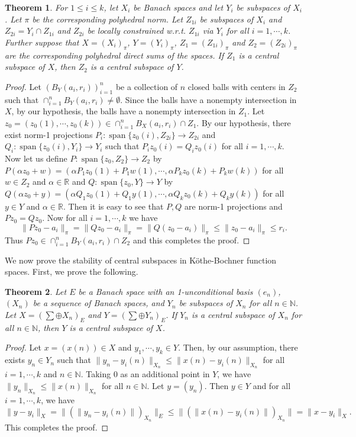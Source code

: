 \documentclass[11pt]{amsart}
\newtheorem{thm}{Theorem}[section]
\newcommand{\ra}{\rightarrow}
\newcommand{\es}{\emptyset}
\newcommand{\al}{\alpha}
\newcommand{\mb}{\mathbb}
\DeclareMathOperator{\spn}{span}
\begin{document}
\begin{thm}
For $1\leq i\leq k$, let $X_i$ be Banach spaces and let $Y_i$ be subspaces of $X_i$. Let $\pi$ be the corresponding polyhedral norm. Let $Z_{1i}$ be subspaces of $X_i$ and  $Z_{2i}=Y_i\cap Z_{1i}$ and $Z_{2i}$ be locally constrained w.r.t. $Z_{1i}$ via $Y_i$ for all $i=1,\cdots,k$. Further suppose that $X=(X_i)_{\pi}$, $Y=(Y_i)_\pi$, $Z_1=(Z_{1i})_\pi$ and $Z_2=(Z_{2i})_\pi$ are the corresponding polyhedral direct sums of the spaces. If $Z_1$ is a central subspace of $X$, then $Z_2$ is a central subspace of $Y$.
\end{thm}
\begin{proof}
Let $(B_Y(a_i,r_i))_{i=1}^n$ be a collection of $n$ closed balls  with centers in $Z_2$ such that $\cap_{i=1}^nB_Y(a_i,r_i)\neq\es$. Since the balls have a nonempty intersection in $X$, by our hypothesis, the balls have a nonempty intersection in $Z_1$. Let $z_0=(z_0(1),\cdots,z_0(k))\in\cap_{i=1}^nB_X(a_i,r_i)\cap Z_1$. By our hypothesis, there exist norm-1 projections $P_i:\spn\{z_0(i),Z_{2i}\}\ra Z_{2i}$ and $Q_i:\spn\{z_0(i),Y_i\}\ra Y_i$ such that $P_iz_0(i)=Q_iz_0(i)$ for all $i=1,\cdots,k$. Now let us define  $P:\spn\{z_0,Z_2\}\ra Z_2$ by $P(\al z_0+w)=(\al P_1z_0(1)+P_1w(1),\cdots,\al P_kz_0(k)+P_kw(k))$ for all $w\in Z_2$ and $\al\in\mb{R}$ and $Q:\spn\{z_0,Y\}\ra Y$ by $Q(\al z_0+y)=(\al Q_1z_0(1)+Q_1y(1),\cdots,\al Q_kz_0(k)+Q_ky(k))$ for all $y\in Y$ and $\al\in\mb{R}$. Then it is easy to see that $P,Q$ are norm-1 projections and $Pz_0=Qz_0$. Now for all $i=1,\cdots,k$ we have 
\[
\|Pz_0-a_i\|_\pi=\|Qz_0-a_i\|_\pi=\|Q(z_0-a_i)\|_\pi\leq\|z_0-a_i\|_\pi\leq r_i.
\]
Thus $Pz_0\in\cap_{i=1}^nB_Y(a_i,r_i)\cap Z_2$ and this completes the proof.
\end{proof}
We now prove the stability of central subspaces in K\"othe-Bochner function spaces. First, we prove the following.
\begin{thm}
Let $E$ be a Banach space with an 1-unconditional basis $(e_n)$, $(X_n)$ be a sequence of Banach spaces,  and $Y_n$ be subspaces of $X_n$ for all $n\in\mb{N}$. Let $X=(\sum\oplus X_n)_E$ and $Y=(\sum\oplus Y_n)_E$. If $Y_n$ is a central subspace of $X_n$  for all $n\in\mb{N}$, then $Y$ is a central subspace of $X$.
\end{thm}
\begin{proof}
Let $x=(x(n))\in X$ and  $y_1,\cdots,y_k\in Y$. Then, by our assumption, there exists $y_n\in Y_n$ such that $\|y_n-y_i(n)\|_{X_n}\leq\|x(n)-y_i(n)\|_{X_n}$ for all $i=1,\cdots,k$ and $n\in\mb{N}$. Taking 0 as an additional point in $Y$, we have $\|y_n\|_{X_n}\leq\|x(n)\|_{X_n}$ for all $n\in\mb{N}$. Let $y=(y_n)$. Then $y\in Y$ and for all $i=1,\cdots,k$, we have
\[\|y-y_i\|_X=\big\|(\|y_n-y_i(n)\|)_{X_n}\big\|_E\leq \big\|(\|x(n)-y_i(n)\|)_{X_n}\big\|=\|x-y_i\|_X.\] 
This completes the proof.
\end{proof}
\end{document}
